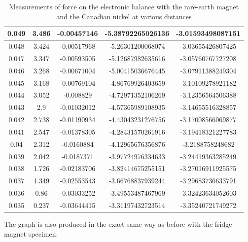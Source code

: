 \documentclass[letterpaper]{article}
\begin{document}
\begin{table}[H]
{\begin{tabular}{|c|c|c|c|c|}
   0.049          & 3.486               & -0.00457146           & -5.38792265026136 & -3.01593498087151 \\ \hline
   0.048          & 3.424               & -0.00517968           & -5.26301200068074 & -3.03655426807425 \\ \hline
   0.047          & 3.347               & -0.00593505           & -5.12687982635616 & -3.05760767727208 \\ \hline
   0.046          & 3.268               & -0.00671004           & -5.00415036676445 & -3.07911388249304 \\ \hline
   0.045          & 3.168               & -0.00769104           & -4.86769926403659 & -3.10109278921182 \\ \hline
   0.044          & 3.052               & -0.008829             & -4.72971352106269 & -3.12356564506388 \\ \hline
   0.043          & 2.9                 & -0.01032012           & -4.57365989108935 & -3.14655516328857 \\ \hline
   0.042          & 2.738               & -0.01190934           & -4.43043231276756 & -3.17008566069877 \\ \hline
   0.041          & 2.547               & -0.01378305           & -4.28431570261916 & -3.19418321227783 \\ \hline
   0.04           & 2.312               & -0.0160884            & -4.12965676356876 & -3.2188758248682  \\ \hline
   0.039          & 2.042               & -0.0187371            & -3.97724976334633 & -3.24419363285249 \\ \hline
   0.038          & 1.726               & -0.02183706           & -3.82414675255151 & -3.27016911925575 \\ \hline
   0.037          & 1.349               & -0.02553543           & -3.66768837939244 & -3.29683736633791 \\ \hline
   0.036          & 0.86                & -0.03033252           & -3.49553487467969 & -3.32423634052603 \\ \hline
   0.035          & 0.237               & -0.03644415           & -3.31197432723514 & -3.35240721749272 \\ \hline
  \end{tabular}
 }
 \caption{Measurements of force on the electronic balance with the rare-earth magnet and the Canadian nickel at various distances}
\end{table}
The graph is also produced in the exact same way as before with the fridge magnet specimen:
\end{document}
